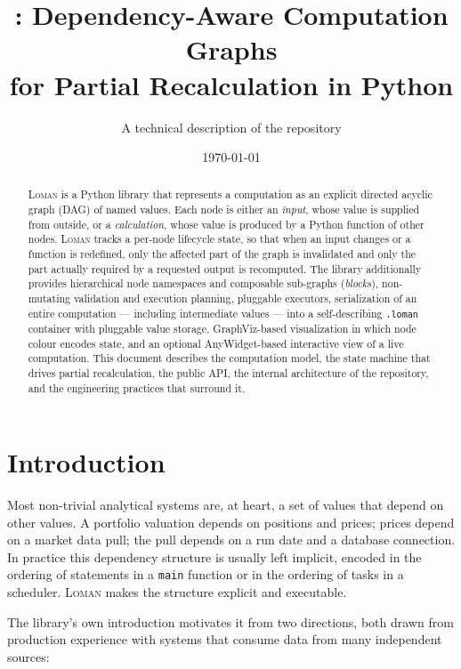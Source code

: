 \documentclass[11pt,a4paper]{article}
\title{\loman: Dependency-Aware Computation Graphs\\ for Partial Recalculation in Python}
\author{A technical description of the \code{loman} repository}
\date{\today}
\newcommand{\loman}{\textsc{Loman}}
\newcommand{\code}[1]{\texttt{#1}}
\begin{document}
\maketitle

\begin{abstract}
\loman{} is a Python library that represents a computation as an explicit
directed acyclic graph (DAG) of named values. Each node is either an
\emph{input}, whose value is supplied from outside, or a \emph{calculation},
whose value is produced by a Python function of other nodes. \loman{} tracks a
per-node lifecycle state, so that when an input changes or a function is
redefined, only the affected part of the graph is invalidated and only the
part actually required by a requested output is recomputed. The library
additionally provides hierarchical node namespaces and composable sub-graphs
(\emph{blocks}), non-mutating validation and execution planning, pluggable
executors, serialization of an entire computation --- including intermediate
values --- into a self-describing \code{.loman} container with pluggable value
storage, GraphViz-based visualization in which node colour encodes state, and
an optional AnyWidget-based interactive view of a live computation. This
document describes the computation model, the state machine that drives partial
recalculation, the public API, the internal architecture of the repository, and
the engineering practices that surround it.
\end{abstract}

\tableofcontents
\bigskip

\section{Introduction}

Most non-trivial analytical systems are, at heart, a set of values that depend
on other values. A portfolio valuation depends on positions and prices;
prices depend on a market data pull; the pull depends on a run date and a
database connection. In practice this dependency structure is usually left
implicit, encoded in the ordering of statements in a \code{main} function or in
the ordering of tasks in a scheduler. \loman{} makes the structure explicit
and executable.

The library's own introduction \cite{lomandocs} motivates it from two
directions, both drawn from production experience with systems that consume
data from many independent sources:
\end{document}
